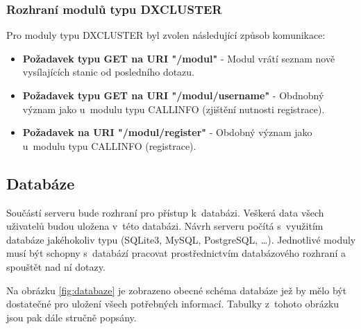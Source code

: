 \subsubsection{Rozhraní modulů typu DXCLUSTER}

Pro moduly typu DXCLUSTER byl zvolen následující způsob komunikace:

\begin{itemize}
\item \textbf{Požadavek typu GET na URI "/modul"} - Modul vrátí seznam nově vysílajících stanic od posledního dotazu.
\item \textbf{Požadavek typu GET na URI "/modul/username"} - Obdnobný význam
jako u~modulu typu CALLINFO (zjištění nutnosti registrace).
\item \textbf{Požadavek na URI "/modul/register"} - Obdobný význam jako u~modulu
typu CALLINFO (registrace).
\end{itemize}

\subsection{Databáze}
\label{navrh_databaze}

Součástí serveru bude rozhraní pro přístup k~databázi. Veškerá data všech
uživatelů budou uložena v~této databázi.
Návrh serveru počítá s~využitím databáze jakéhokoliv typu (SQLite3, MySQL,
PostgreSQL, \dots). Jednotlivé moduly musí být schopny s~databází pracovat
prostřednictvím databázového rozhraní a spouštět nad ní dotazy.

Na obrázku \ref{fig:databaze} je zobrazeno obecné schéma databáze jež by mělo
být dostatečné pro uložení všech potřebných informací. Tabulky
z~tohoto obrázku jsou pak dále stručně popsány.

